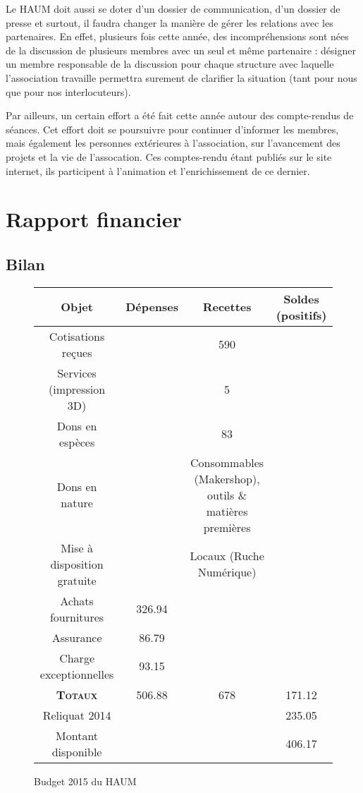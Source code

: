 \documentclass[a4paper, 11pt]{article}
\begin{document}
\medskip

Le HAUM doit aussi se doter d'un dossier de communication, d'un dossier de presse et surtout, il faudra changer la manière de gérer les relations avec les partenaires.
En effet, plusieurs fois cette année, des incompréhensions sont nées de la discussion de plusieurs membres avec un seul
et même partenaire : désigner un membre responsable de la discussion pour chaque structure avec laquelle l'association
travaille permettra surement de clarifier la situation (tant pour nous que pour nos interlocuteurs).

Par ailleurs, un certain effort a été fait cette année autour des compte-rendus de séances. Cet effort doit se
poursuivre pour continuer d'informer les membres, mais également les personnes extérieures à l'association, sur
l'avancement des projets et la vie de l'assocation. Ces comptes-rendu étant publiés sur le site internet, ils
participent à l'animation et l'enrichissement de ce dernier.

\section{Rapport financier}

\subsection{Bilan}

\begin{figure}[!ht]\centering
	\begin{tabular}{c|ccc}
		Objet & Dépenses & Recettes & Soldes (positifs)\\\hline
		Cotisations reçues & & 590 & \\
		Services (impression 3D) & & 5 & \\
		Dons en espèces & & 83 & \\
		Dons en nature & & \parbox[c]{5cm}{Consommables (Makershop),\\outils \& matières premières}  & \\
		Mise à disposition gratuite & & Locaux (Ruche Numérique) & \\\hline\hline
		Achats fournitures & 326.94 & & \\
		Assurance & 86.79 & & \\
		Charge exceptionnelles & 93.15 & & \\\hline\hline
		\textsc{\textbf{Totaux}} & 506.88 & 678 & 171.12\\\hline
		Reliquat 2014 & & & 235.05\\
		Montant disponible & & & 406.17
	\end{tabular}
	\caption{Budget 2015 du HAUM}
\end{figure}
\end{document}
